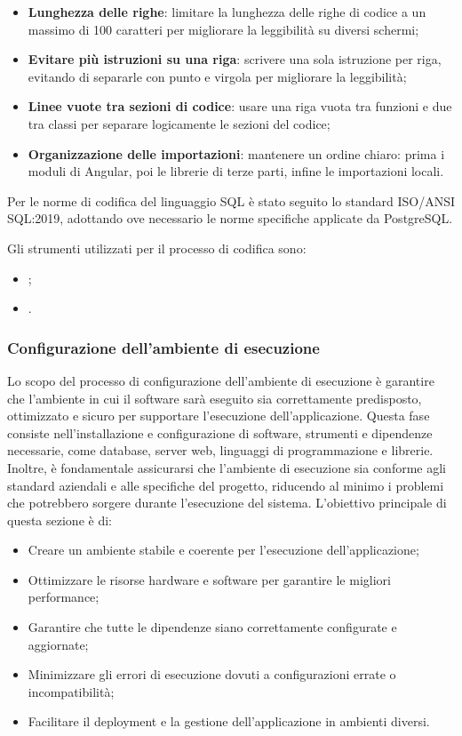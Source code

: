 \begin{itemize}
    \item \textbf{Lunghezza delle righe}: limitare la lunghezza delle righe di codice a un massimo di 100 caratteri per migliorare la leggibilità su diversi schermi;
    \item \textbf{Evitare più istruzioni su una riga}: scrivere una sola istruzione per riga, evitando di separarle con punto e virgola per migliorare la leggibilità;
    \item \textbf{Linee vuote tra sezioni di codice}: usare una riga vuota tra funzioni e due tra classi per separare logicamente le sezioni del codice;
    \item \textbf{Organizzazione delle importazioni}: mantenere un ordine chiaro: prima i moduli di Angular, poi le librerie di terze parti, infine le importazioni locali.
\end{itemize}

Per le norme di codifica del linguaggio SQL è stato seguito lo standard ISO/ANSI SQL:2019, adottando ove necessario le norme specifiche applicate da PostgreSQL.

Gli strumenti utilizzati per il processo di codifica sono:
\begin{itemize}
    \item {};
    \item {}.
\end{itemize}

\subsubsection{Configurazione dell’ambiente di esecuzione}
Lo scopo del processo di configurazione dell'ambiente di esecuzione è garantire che l'ambiente in cui il software sarà eseguito sia correttamente predisposto, ottimizzato e sicuro per supportare l'esecuzione dell'applicazione. Questa fase consiste nell'installazione e configurazione di software, strumenti e dipendenze necessarie, come database, server web, linguaggi di programmazione e librerie. Inoltre, è fondamentale assicurarsi che l'ambiente di esecuzione sia conforme agli standard aziendali e alle specifiche del progetto, riducendo al minimo i problemi che potrebbero sorgere durante l'esecuzione del sistema. L'obiettivo principale di questa sezione è di:
\begin{itemize}
    \item Creare un ambiente stabile e coerente per l'esecuzione dell'applicazione;
    \item Ottimizzare le risorse hardware e software per garantire le migliori performance;
    \item Garantire che tutte le dipendenze siano correttamente configurate e aggiornate;
    \item Minimizzare gli errori di esecuzione dovuti a configurazioni errate o incompatibilità;
    \item Facilitare il deployment e la gestione dell'applicazione in ambienti diversi.
\end{itemize}


